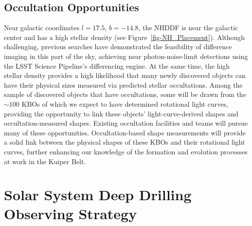 \documentclass[modern,linenumbers,trackchanges,preprint]{aastex631}
\begin{document}
\subsection{Occultation Opportunities}
Near galactic coordinates $l=17.5$, $b=-14.8$, the NHDDF is near the galactic center and has a high stellar density (see Figure~\ref{fig-NH_Placement}).  Although challenging, previous searches \citep[e.g.][]{Fraser2024PSJ} have demonstrated the feasibility of difference imaging in this part of the sky, achieving near photon-noise-limit detections using the LSST Science Pipeline's differencing engine.
At the same time, the high stellar density provides a high likelihood that many newly discovered objects can have their physical sizes measured via predicted stellar occultations. Among the sample of discovered objects that have occultations, some will be drawn from the $\sim 100$ KBOs of which we expect to have determined rotational light curves, providing the opportunity to link these objects' light-curve-derived shapes and occultation-measured shapes. Existing occultation facilities \cite[e.g.][]{RECON16} and teams will pursue many of these opportunities. Occultation-based shape measurements will provide a solid link between the physical shapes of these KBOs and their rotational light curves, further enhancing our knowledge of the formation and evolution processes at work in the Kuiper Belt.

\section{Solar System Deep Drilling Observing Strategy\label{sec:strategy}}
\end{document}
